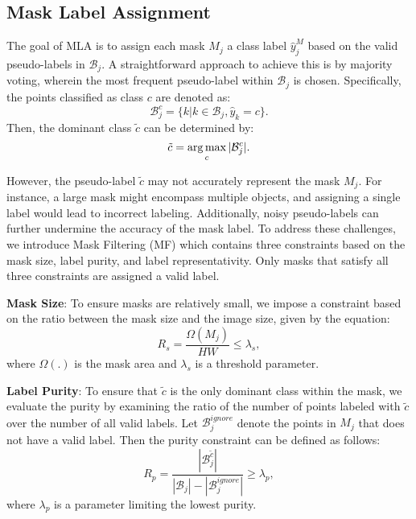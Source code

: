 \subsection{Mask Label Assignment} \label{MLA}
The goal of MLA is to assign each mask $M_j$ a class label $\hat{y}^{M}_j$ based on the valid pseudo-labels in $\mathcal{B}_{j}$. A straightforward approach to achieve this is by majority voting, wherein the most frequent pseudo-label within $\mathcal{B}_{j}$ is chosen. Specifically, the points classified as class $c$ are denoted as:
\begin{equation}
\mathcal{B}_{j}^c = \{k | k \in \mathcal{B}_{j}, \hat{y}_k = c\}.
\label{equ:getpoints1}
\end{equation}
Then, the dominant class $\tilde{c}$ can be determined by:
\begin{equation}
\tilde{c} = \operatorname*{arg\,max}_c |\mathcal{B}_{j}^c|.
\label{equ:getclass}
\end{equation}

However, the pseudo-label $\tilde{c}$ may not accurately represent the mask $M_j$. For instance, a large mask might encompass multiple objects, and assigning a single label would lead to incorrect labeling. Additionally, noisy pseudo-labels can further undermine the accuracy of the mask label. To address these challenges, we introduce Mask Filtering (MF) which contains three constraints based on the mask size, label purity, and label representativity. Only masks that satisfy all three constraints are assigned a valid label. 

\textbf{Mask Size}: To ensure masks are relatively small, we impose a constraint based on the ratio between the mask size and the image size, given by the equation:
\begin{equation}
R_{s} = \frac{\Omega(M_j)}{HW} \leq \lambda_s,
\label{equ:rsize}
\end{equation}
where $\Omega(.)$ is the mask area and $\lambda_s$ is a threshold parameter. 

\textbf{Label Purity}: To ensure that $\tilde{c}$ is the only dominant class within the mask, we evaluate the purity by examining the ratio of the number of points labeled with $\tilde{c}$ over the number of all valid labels. Let $\mathcal{B}_j^{ignore}$ denote the points in $M_j$ that does not have a valid label. Then the purity constraint can be defined as follows:
\begin{equation}
R_{p} = \frac{|\mathcal{B}_j^{\tilde{c}}|}{|\mathcal{B}_j|-|\mathcal{B}_j^{ignore}|} \geq \lambda_p,
\label{equ:rp}
\end{equation}
where $\lambda_p$ is a parameter limiting the lowest purity.

